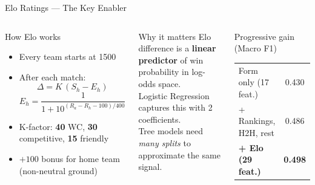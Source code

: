 \documentclass[10pt,aspectratio=169]{beamer}
\begin{document}
\begin{frame}{Elo Ratings --- The Key Enabler}
  \begin{columns}[T]
      \begin{block}{How Elo works}
        \begin{itemize}
          \item Every team starts at 1500
          \item After each match:
          \[
            \Delta = K\,(S_h - E_h)
          \]
          \[
            E_h = \frac{1}{1 + 10^{(R_a - R_h - 100)/400}}
          \]
          \item K-factor: \textbf{40} WC, \textbf{30} competitive, \textbf{15} friendly
          \item $+100$ bonus for home team (non-neutral ground)
        \end{itemize}
      \end{block}

      \begin{block}{Why it matters}
        Elo difference is a \textbf{linear predictor} of win probability
        in log-odds space.\\[5pt]
        Logistic Regression captures this with 2 coefficients.\\[5pt]
        Tree models need \textit{many splits} to approximate the same signal.
      \end{block}

      \medskip
      \begin{alertblock}{Progressive gain (Macro F1)}
        \begin{tabular}{lc}
          Form only (17 feat.) & 0.430 \\
          + Rankings, H2H, rest & 0.486 \\
          \textbf{+ Elo (29 feat.)} & \textbf{0.498} \\
        \end{tabular}
      \end{alertblock}
  \end{columns}
\end{frame}
\end{document}
